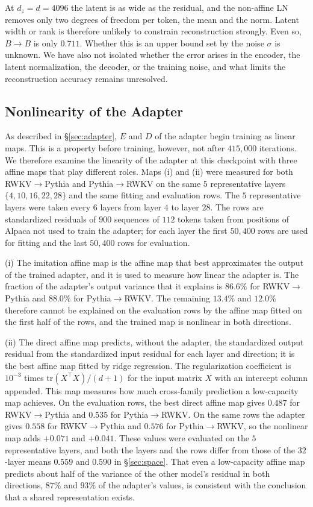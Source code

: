 \documentclass[conference]{IEEEtran}
\newcommand{\RtoP}{RWKV$\to$\allowbreak Pythia}
\newcommand{\PtoR}{Pythia$\to$\allowbreak RWKV}
\begin{document}
At $d_z{=}d{=}4096$ the latent is as wide as the residual, and the non-affine LN removes only two degrees of freedom per token, the
mean and the norm. Latent width or rank is therefore unlikely to constrain reconstruction strongly. Even so, $B\!\to\!B$ is only $0.711$.
Whether this is an upper bound set by the noise $\sigma$ is unknown. We have also not isolated whether the error arises in the encoder,
the latent normalization, the decoder, or the training noise, and what limits the reconstruction accuracy remains unresolved.

\subsection{Nonlinearity of the Adapter}\label{sec:linear}
As described in \S\ref{sec:adapter}, $E$ and $D$ of the adapter begin training as linear maps.
This is a property before training, however, not after $415{,}000$ iterations. We therefore examine the linearity of the adapter at
this checkpoint with three affine maps that play different roles. Maps (i) and (ii) were measured for both \RtoP{} and \PtoR{} on
the same $5$ representative layers $\{4,10,16,22,28\}$ and the same fitting and evaluation rows. The $5$ representative layers were
taken every $6$ layers from layer $4$ to layer $28$. The rows are standardized residuals of
$900$ sequences of $112$ tokens taken from positions of Alpaca not used to train the adapter; for each layer the first $50{,}400$ rows
are used for fitting and the last $50{,}400$ rows for evaluation.

(i) The imitation affine map is the affine map that best approximates the output of the trained adapter, and it is used to measure how
linear the adapter is. The fraction of the adapter's output variance that it explains is
$86.6\%$ for \RtoP{} and $88.0\%$ for \PtoR{}. The remaining $13.4\%$ and $12.0\%$ therefore cannot be explained on the evaluation rows by the affine map fitted on the first half of
the rows, and
the trained map is nonlinear in both directions.

(ii) The direct affine map predicts, without the adapter, the standardized output residual from the standardized input residual for
each layer and direction; it is the best affine map fitted by ridge regression. The regularization coefficient is
$10^{-3}$ times $\mathrm{tr}(X^{\top}X)/(d{+}1)$ for the input matrix $X$ with an intercept column appended. This map measures how much
cross-family prediction a low-capacity map achieves. On the evaluation rows,
the best direct affine map gives $0.487$ for \RtoP{} and $0.535$ for \PtoR{}. On the same rows the adapter gives $0.558$ for \RtoP{}
and $0.576$ for \PtoR{}, so
the nonlinear map adds $+0.071$ and $+0.041$. These values were evaluated on the $5$ representative layers, and both the layers
and the rows differ from those of the $32$-layer means $0.559$ and $0.590$ in \S\ref{sec:space}. That even a low-capacity affine map predicts
about half of the variance of the other model's residual in both directions, $87\%$ and $93\%$ of the adapter's values, is consistent with the
conclusion that a shared representation exists.
\end{document}
